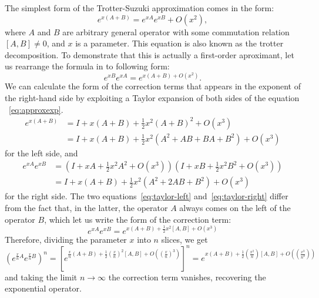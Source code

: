 The simplest form of the Trotter-Suzuki approximation comes in the form:
\begin{equation} \label{eq:approxexp}
e^{x(A+B)} = e^{xA}e^{xB} + O(x^2), 
\end{equation}
where $A$ and $B$ are arbitrary general operator with some commutation relation $[A,B] \neq 0$, and $x$ is a parameter. This equation is also known as the trotter decomposition. To demonstrate that this is actually a first-order aproximant, let us rearrange the formula in to following form:
\begin{equation}
e^{xB}e^{xA} = e^{x(A+B) + O(x^2)}.
\end{equation}
We can calculate the form of the correction terms that appears in the exponent of the right-hand side by exploiting a Taylor expansion of both sides of the equation ~\eqref{eq:approxexp}.
\begin{subequations} \label{eq:taylor-left}
\begin{align}
e^{x(A+B)} &= I + x(A+B) + \frac{1}{2} x^2 (A+B)^2 + O(x^3) \\
& = I + x(A+B) + \frac{1}{2} x^2 (A^2 + AB + BA + B^2) + O(x^3) 
\end{align}
\end{subequations}
for the left side, and
\begin{subequations}  \label{eq:taylor-right}
\begin{align}
e^{xA}e^{xB} &= (I + xA + \frac{1}{2} x^2 A^2 + O(x^3)) (I + xB + \frac{1}{2} x^2 B^2 + O(x^3))\\
& = I + x(A+B) + \frac{1}{2} x^2 (A^2 + 2AB + B^2) + O(x^3)  
\end{align}
\end{subequations}
for the right side. The two equations~\eqref{eq:taylor-left} and~\eqref{eq:taylor-right} differ from the fact that, in the latter, the operator $A$ always comes on the left of the operator $B$, which let us write the form of the correction term:
\begin{equation}
e^{xA} e^{xB} = e^{x(A+B) + \frac{1}{2} x^2 [A,B] + O(x^3)}
\end{equation}
Therefore, dividing the parameter $x$ into $n$ slices, we get
\begin{equation}
\left(e^{\frac{x}{n}A} e^{\frac{x}{n}B} \right)^n = \left[ e^{\frac{x}{n}(A + B) + \frac{1}{2}(\frac{x}{n})^2 [A,B] + O((\frac{x}{n})^3)} \right]^n = e^{x(A+B) + \frac{1}{2}(\frac{x^2}{n}) [A,B] + O((\frac{x^3}{n^2}))} 
\end{equation}
and taking the limit $n \rightarrow \infty$ the correction term vanishes, recovering the exponential operator.

